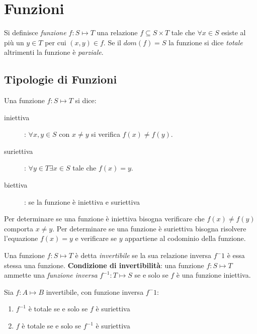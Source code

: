 \chapter{Funzioni}
Si definisce \textit{funzione $f:S \mapsto T$} una relazione $f \subseteq S \times T$
tale che $\forall x \in S$ esiste al più un $y \in T$ per cui $(x,y) \in f$.\newline
Se il $dom(f) = S$ la funzione si dice \emph{totale} altrimenti la funzione è \emph{parziale}.

\section{Tipologie di Funzioni}
Una funzione $f:S \mapsto T$ si dice:
\begin{description}
    \item[iniettiva]: $\forall x,y \in S$ con $x \neq y$ si verifica $f(x) \neq f(y)$.
    \item[suriettiva]: $\forall y \in T \exists x \in S$ tale che $f(x) = y$.
    \item[biettiva]: se la funzione è iniettiva e suriettiva
\end{description}
Per determinare se una funzione è iniettiva bisogna verificare che $f(x) \neq f(y)$
comporta $x \neq y$.
Per determinare se una funzione è suriettiva bisogna risolvere l'equazione $f(x) = y$
e verificare se $y$ appartiene al codominio della funzione.

Una funzione $f:S \mapsto T$ è detta \emph{invertibile} se la sua relazione inversa
$f ^ -1$ è essa stessa una funzione.\newline
\textbf{Condizione di invertibilità}: una funzione $f:S \mapsto T$ ammette una \emph{funzione inversa}
 $f ^{-1} :T \mapsto S$ se e solo se $f$ è una funzione iniettiva.

\begin{thm}
Sia $f:A \mapsto B$ invertibile, con funzione inversa $f ^ -1$:
\end{thm}
\begin{enumerate}
    \item $f^{-1}$ è totale se e solo se $f$ è suriettiva
    \item $f$ è totale se e solo se $f^{-1}$ è suriettiva
\end{enumerate}


